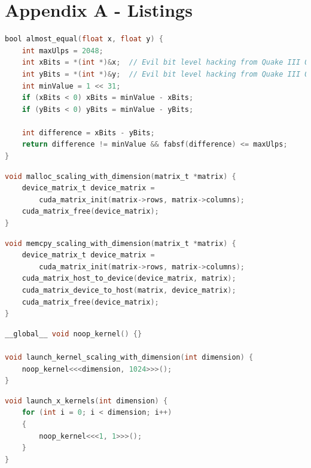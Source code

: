 \section*{Appendix A - Listings}

\begin{lstlisting}[language=C, caption={Almost Equal algorithm}, label={lst:almost_equal}]
bool almost_equal(float x, float y) {
    int maxUlps = 2048;
    int xBits = *(int *)&x;  // Evil bit level hacking from Quake III Q_sqrt
    int yBits = *(int *)&y;  // Evil bit level hacking from Quake III Q_sqrt
    int minValue = 1 << 31;
    if (xBits < 0) xBits = minValue - xBits;
    if (yBits < 0) yBits = minValue - yBits;

    int difference = xBits - yBits;
    return difference != minValue && fabsf(difference) <= maxUlps;
}
\end{lstlisting}

\begin{lstlisting}[language=C, caption={Code to measure allocating and freeing memory}, label={lst:cudaMalloc}]
void malloc_scaling_with_dimension(matrix_t *matrix) {
    device_matrix_t device_matrix =
        cuda_matrix_init(matrix->rows, matrix->columns);
    cuda_matrix_free(device_matrix);
}
\end{lstlisting}

\begin{lstlisting}[language=C, caption={Code to measure moving memory}, label={lst:cudaMemcopy}]
void memcpy_scaling_with_dimension(matrix_t *matrix) {
    device_matrix_t device_matrix =
        cuda_matrix_init(matrix->rows, matrix->columns);
    cuda_matrix_host_to_device(device_matrix, matrix);
    cuda_matrix_device_to_host(matrix, device_matrix);
    cuda_matrix_free(device_matrix);
}
\end{lstlisting}

\begin{lstlisting}[language=C, caption={Code to measure spawning more blocks}, label={lst:noop}]
__global__ void noop_kernel() {}

void launch_kernel_scaling_with_dimension(int dimension) {
    noop_kernel<<<dimension, 1024>>>();
}
\end{lstlisting}

\begin{lstlisting}[language=C, caption={Code to measure the launch of asynchronous kernels}, label={lst:asynchronous kernels}]
void launch_x_kernels(int dimension) {
    for (int i = 0; i < dimension; i++)
    {
        noop_kernel<<<1, 1>>>();
    }
}
\end{lstlisting}

